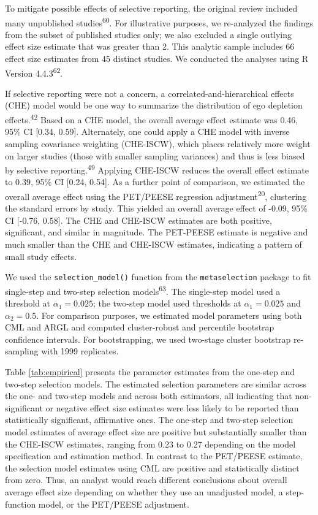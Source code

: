 \documentclass[
  american,
  man, donotrepeattitle,floatsintext]{apa7}
\begin{document}
To mitigate possible effects of selective reporting, the original review included many unpublished studies\textsuperscript{60}.
For illustrative purposes, we re-analyzed the findings from the subset of published studies only; we also excluded a single outlying effect size estimate that was greater than 2. This analytic sample includes 66 effect size estimates from 45 distinct studies.
We conducted the analyses using R Version 4.4.3\textsuperscript{62}.

If selective reporting were not a concern, a correlated-and-hierarchical effects (CHE) model would be one way to summarize the distribution of ego depletion effects.\textsuperscript{42}
Based on a CHE model, the overall average effect estimate was 0.46, 95\% CI {[}0.34, 0.59{]}.
Alternately, one could apply a CHE model with inverse sampling covariance weighting (CHE-ISCW), which places relatively more weight on larger studies (those with smaller sampling variances) and thus is less biased by selective reporting.\textsuperscript{49}
Applying CHE-ISCW reduces the overall effect estimate to 0.39, 95\% CI {[}0.24, 0.54{]}.
As a further point of comparison, we estimated the overall average effect using the PET/PEESE regression adjustment\textsuperscript{20}, clustering the standard errors by study. This yielded an overall average effect of -0.09, 95\% CI {[}-0.76, 0.58{]}. The CHE and CHE-ISCW estimates are both positive, significant, and similar in magnitude. The PET-PEESE estimate is negative and much smaller than the CHE and CHE-ISCW estimates, indicating a pattern of small study effects.

We used the \texttt{selection\_model()} function from the \texttt{metaselection} package to fit single-step and two-step selection models\textsuperscript{63}.
The single-step model used a threshold at \(\alpha_1 = 0.025\); the two-step model used thresholds at \(\alpha_1 = 0.025\) and \(\alpha_2 = 0.5\).
For comparison purposes, we estimated model parameters using both CML and ARGL and computed cluster-robust and percentile bootstrap confidence intervals.
For bootstrapping, we used two-stage cluster bootstrap re-sampling with 1999 replicates.

Table \ref{tab:empirical} presents the parameter estimates from the one-step and two-step selection models.
The estimated selection parameters are similar across the one- and two-step models and across both estimators, all indicating that non-significant or negative effect size estimates were less likely to be reported than statistically significant, affirmative ones.
The one-step and two-step selection model estimates of average effect size are positive but substantially smaller than the CHE-ISCW estimates, ranging from 0.23 to 0.27 depending on the model specification and estimation method.
In contrast to the PET/PEESE estimate, the selection model estimates using CML are positive and statistically distinct from zero.
Thus, an analyst would reach different conclusions about overall average effect size depending on whether they use an unadjusted model, a step-function model, or the PET/PEESE adjustment.
\end{document}

